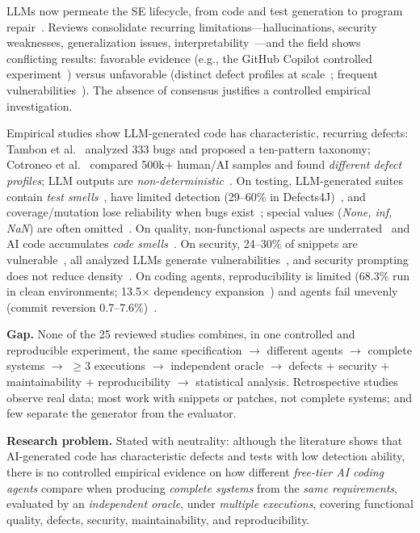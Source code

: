 \documentclass[10pt,twocolumn]{article}
\begin{document}
LLMs now permeate the SE lifecycle, from code and test generation to program repair~\cite{A01}. Reviews consolidate recurring limitations---hallucinations, security weaknesses, generalization issues, interpretability~\cite{A02}---and the field shows conflicting results: favorable evidence (e.g., the GitHub Copilot controlled experiment~\cite{D03}) versus unfavorable (distinct defect profiles at scale~\cite{B03}; frequent vulnerabilities~\cite{E01}). The absence of consensus justifies a controlled empirical investigation.

Empirical studies show LLM-generated code has characteristic, recurring defects: Tambon et al.~\cite{B01} analyzed 333 bugs and proposed a ten-pattern taxonomy; Cotroneo et al.~\cite{B03} compared 500k+ human/AI samples and found \emph{different defect profiles}; LLM outputs are \emph{non-deterministic}~\cite{B04}. On testing, LLM-generated suites contain \emph{test smells}~\cite{C03}, have limited detection (29--60\% in Defects4J)~\cite{C04}, and coverage/mutation lose reliability when bugs exist~\cite{C05}; special values (\emph{None, inf, NaN}) are often omitted~\cite{C06}. On quality, non-functional aspects are underrated~\cite{D04} and AI code accumulates \emph{code smells}~\cite{D05}. On security, 24--30\% of snippets are vulnerable~\cite{E01}, all analyzed LLMs generate vulnerabilities~\cite{E02}, and security prompting does not reduce density~\cite{E03}. On coding agents, reproducibility is limited (68.3\% run in clean environments; 13.5$\times$ dependency expansion~\cite{F02}) and agents fail unevenly (commit reversion 0.7--7.6\%)~\cite{F05}.

\textbf{Gap.} None of the 25 reviewed studies combines, in one controlled and reproducible experiment, the same specification $\rightarrow$ different agents $\rightarrow$ complete systems $\rightarrow$ $\ge$3 executions $\rightarrow$ independent oracle $\rightarrow$ defects $+$ security $+$ maintainability $+$ reproducibility $\rightarrow$ statistical analysis. Retrospective studies observe real data; most work with snippets or patches, not complete systems; and few separate the generator from the evaluator.

\textbf{Research problem.} Stated with neutrality: although the literature shows that AI-generated code has characteristic defects and tests with low detection ability, there is no controlled empirical evidence on how different \emph{free-tier AI coding agents} compare when producing \emph{complete systems} from the \emph{same requirements}, evaluated by an \emph{independent oracle}, under \emph{multiple executions}, covering functional quality, defects, security, maintainability, and reproducibility.
\end{document}
